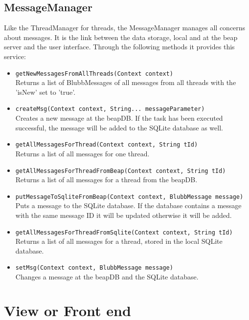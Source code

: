 \documentclass[12pt,a4paper,oneside]{report}
\newcommand{\beapDB}{beapDB}
\newcommand{\beapServer}{beap server}
\newcommand{\code}[1]{\lstinline{#1}}
\begin{document}
\subsection{MessageManager}
Like the ThreadManager for threads, the MessageManager manages all concerns about messages. It is the link between the data storage, local and at the \beapServer{} and the user interface. Through the following methods it provides this service:
\begin{itemize}
\item{\code{getNewMessagesFromAllThreads(Context context)}}\\
Returns a list of BlubbMessages of all messages from all threads with the 'isNew' set to 'true'. 

\item{\code{createMsg(Context context, String... messageParameter)}}\\
 Creates a new message at the \beapDB{}. If the task has been executed successful, the message will be added to the SQLite database as well.
     
\item{\code{getAllMessagesForThread(Context context, String tId)}}\\
Returns a list of all messages for one thread.

\item{\code{getAllMessagesForThreadFromBeap(Context context, String tId)}}\\
Returns a list of all messages for a thread from the \beapDB{}.

\item{\code{putMessageToSqliteFromBeap(Context context, BlubbMessage message)}}\\
 Puts a message to the SQLite database. If the database contains a message with the same message ID it will be updated otherwise it will be added.
     
\item{\code{getAllMessagesForThreadFromSqlite(Context context, String tId)}}\\
Returns a list of all messages for a thread, stored in the local SQLite database.

\item{\code{setMsg(Context context, BlubbMessage message)}}\\
Changes a message at the \beapDB{} and the SQLite database.
\end{itemize}

\section{View or Front end}
\end{document}
